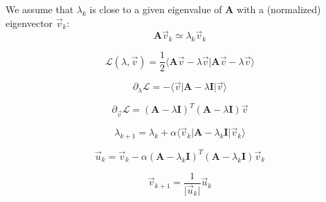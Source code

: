 \documentclass[aps,12pt]{revtex4}
\begin{document}
We assume that $\lambda_k$ is close to a given eigenvalue of $\bm{A}$ with a (normalized) eigenvector $\vec{v}_k$:
\begin{equation}
	\bm{A} \vec{v}_k \simeq \lambda_k \vec{v}_k
\end{equation}

\begin{equation}
	\mathcal{L}(\lambda,\vec{v}) = 
	\dfrac{1}{2} 
	\langle \bm{A}\vec{v} - \lambda \vec{v} \vert \bm{A}\vec{v} - \lambda \vec{v}\rangle
\end{equation}

\begin{equation}
	\partial_\lambda \mathcal{L} = - \langle \vec{v} \vert \bm{A}  - \lambda \bm{I} \vert \vec{v} \rangle
\end{equation}

\begin{equation}
	\partial_{\vec{v}} \mathcal{L} =  (\bm{A}  - \lambda \bm{I})^T  (\bm{A}  - \lambda \bm{I}) \vec{v}
\end{equation}

\begin{equation}
	\lambda_{k+1} = \lambda_k + \alpha \langle \vec{v}_k \vert \bm{A}  - \lambda_k \bm{I} \vert \vec{v}_k \rangle
\end{equation}

\begin{equation}
	\vec{u}_k = \vec{v}_k - \alpha (\bm{A}  - \lambda_k \bm{I})^T(\bm{A}  - \lambda_k \bm{I}) \vec{v}_k
\end{equation}

\begin{equation}
	\vec{v}_{k+1} = \dfrac{1}{\vert \vec{u}_k \vert} \vec{u}_k
\end{equation}
\end{document}
